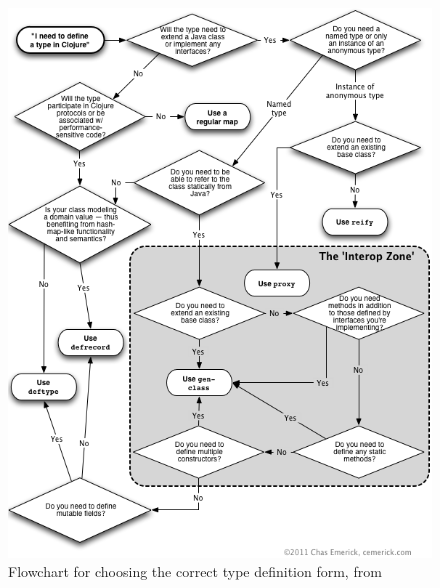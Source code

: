\documentclass[12pt]{article}
\begin{document}
	\begin{figure}[H]
	\begin{center}
	\includegraphics[scale=.55]{images/choosingtypeforms.png}
	\caption{Flowchart for choosing the correct type definition form, from \cite{choosing-types}\label{type:flow}}
	\end{center}	
	\end{figure}
	
\end{document}
